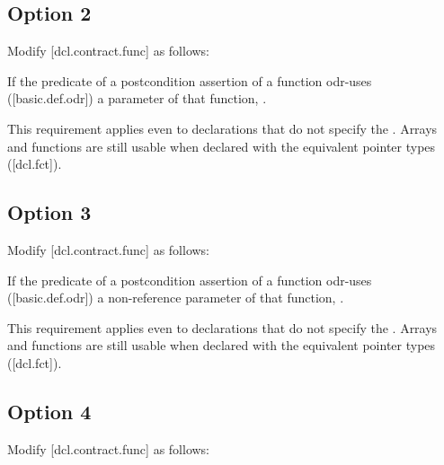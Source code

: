\subsection{Option 2}

Modify [dcl.contract.func] as follows:

\begin{adjustwidth}{0.5cm}{0.5cm}
If the predicate of a postcondition assertion of a function odr-uses ([basic.def.odr]) a
parameter of that function, .
\begin{note}
This requirement applies even to declarations
that do not specify the . Arrays and functions are still usable when declared with the equivalent pointer types ([dcl.fct]).
\end{note}
\begin{example}
\tcode{[...]}
\end{example}
\end{adjustwidth}

\subsection{Option 3}

Modify [dcl.contract.func] as follows:

\begin{adjustwidth}{0.5cm}{0.5cm}
If the predicate of a postcondition assertion of a function odr-uses ([basic.def.odr]) a
non-reference parameter of that function, .
\begin{note}
This requirement applies even to declarations
that do not specify the . Arrays and functions are still usable when declared with the equivalent pointer types ([dcl.fct]).
\end{note}
\begin{example}
\tcode{[...]}
\end{example}
\end{adjustwidth}

\subsection{Option 4}

Modify [dcl.contract.func] as follows:

